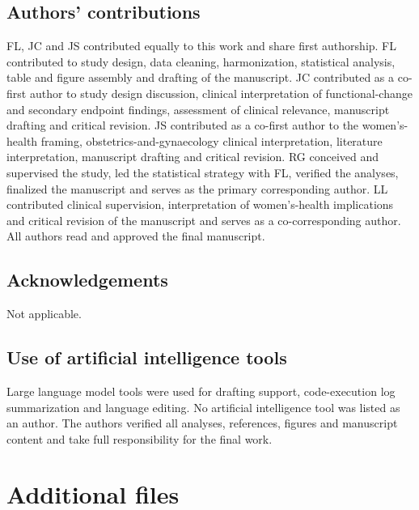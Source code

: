 \documentclass[pdflatex,sn-vancouver-num]{sn-jnl}
\begin{document}
\subsection*{Authors' contributions}
FL, JC and JS contributed equally to this work and share first authorship. FL contributed to study design, data cleaning, harmonization, statistical analysis, table and figure assembly and drafting of the manuscript. JC contributed as a co-first author to study design discussion, clinical interpretation of functional-change and secondary endpoint findings, assessment of clinical relevance, manuscript drafting and critical revision. JS contributed as a co-first author to the women's-health framing, obstetrics-and-gynaecology clinical interpretation, literature interpretation, manuscript drafting and critical revision. RG conceived and supervised the study, led the statistical strategy with FL, verified the analyses, finalized the manuscript and serves as the primary corresponding author. LL contributed clinical supervision, interpretation of women's-health implications and critical revision of the manuscript and serves as a co-corresponding author. All authors read and approved the final manuscript.

\subsection*{Acknowledgements}
Not applicable.

\subsection*{Use of artificial intelligence tools}
Large language model tools were used for drafting support, code-execution log summarization and language editing. No artificial intelligence tool was listed as an author. The authors verified all analyses, references, figures and manuscript content and take full responsibility for the final work.













\section*{Additional files}
\end{document}
